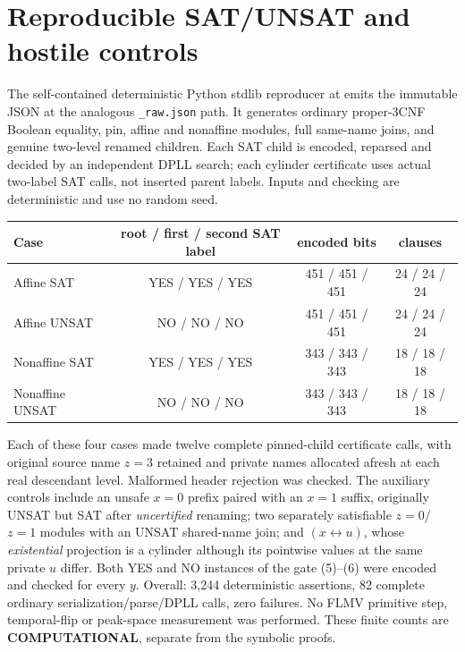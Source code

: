 \documentclass[11pt]{article}
\begin{document}
\section{Reproducible SAT/UNSAT and hostile controls}
The self-contained deterministic Python stdlib reproducer at
emits the immutable JSON at the analogous \texttt{\_raw.json} path.
It generates ordinary proper-3CNF Boolean equality, pin, affine and
nonaffine modules, full same-name joins, and genuine two-level
renamed children. Each SAT child is encoded, reparsed and decided by
an independent DPLL search; each cylinder certificate uses actual
two-label SAT calls, not inserted parent labels. Inputs and checking
are deterministic and use no random seed.

\begin{center}
\begin{tabular}{lccc}
\toprule
Case & root / first / second SAT label & encoded bits & clauses\\
\midrule
Affine SAT & YES / YES / YES & 451 / 451 / 451 & 24 / 24 / 24\\
Affine UNSAT & NO / NO / NO & 451 / 451 / 451 & 24 / 24 / 24\\
Nonaffine SAT & YES / YES / YES & 343 / 343 / 343 & 18 / 18 / 18\\
Nonaffine UNSAT & NO / NO / NO & 343 / 343 / 343 & 18 / 18 / 18\\
\bottomrule
\end{tabular}
\end{center}
Each of these four cases made twelve complete pinned-child certificate
calls, with original source name \(z=3\) retained and private names
allocated afresh at each real descendant level. Malformed header
rejection was checked. The auxiliary controls include an unsafe
\(x=0\) prefix paired with an \(x=1\) suffix, originally UNSAT but SAT
after \emph{uncertified} renaming; two separately satisfiable
\(z=0\)/\(z=1\) modules with an UNSAT shared-name join; and
\((x\leftrightarrow u)\), whose \emph{existential} projection is a
cylinder although its pointwise values at the same private
\(u\) differ. Both YES and NO instances of the gate (5)--(6) were
encoded and checked for every \(y\). Overall: 3,244 deterministic
assertions, 82 complete ordinary serialization/parse/DPLL calls,
zero failures. No FLMV primitive step, temporal-flip or peak-space
measurement was performed. These finite counts are
\textbf{COMPUTATIONAL}, separate from the symbolic proofs.
\end{document}
